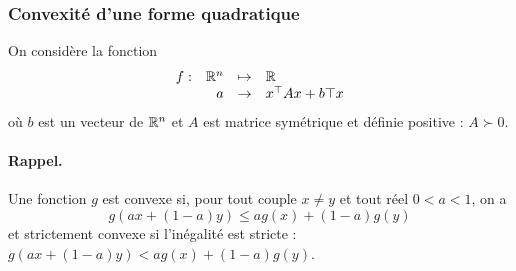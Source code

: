 \subsubsection{Convexité d'une forme quadratique}

On considère la fonction 
$$
\begin{array}{rrcl}
  f : & \mathbb{R}^n & \mapsto & \mathbb{R} \\
  & a & \to & x^\top A x + b\top x
\end{array}
$$
où $b$ est un vecteur de $\mathbb{R}^n$ et $A$ est matrice symétrique et définie positive : $A \succ 0$.

\paragraph{Rappel.} 
Une fonction $g$ est convexe si, pour tout couple $x \neq y$ et tout réel $0 < a < 1$, on a
$$
g\left(a x + (1-a) y\right) \leq a g(x) + (1-a) g(y)
$$
et strictement convexe si l'inégalité est stricte : $g(a x + (1-a) y) < a g(x) + (1-a) g(y)$.

